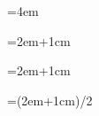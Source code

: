 \documentclass{article}
\begin{document}

\indent \printlength{\parindent}\par
\parindent=1pt\indent \printlength{\parindent}\par
\parindent=4em\indent \printlength{\parindent}\par
{}\parindent\indent \printlength{\parindent}\par
\parindent=2em+1cm\indent \printlength{\parindent}\par
\parindent=\dimexpr2em+1cm\indent \printlength{\parindent}\par
\parindent=\dimexpr(2em+1cm)/2\indent \printlength{\parindent}\par




\vspace*{\fill}
\end{document}
